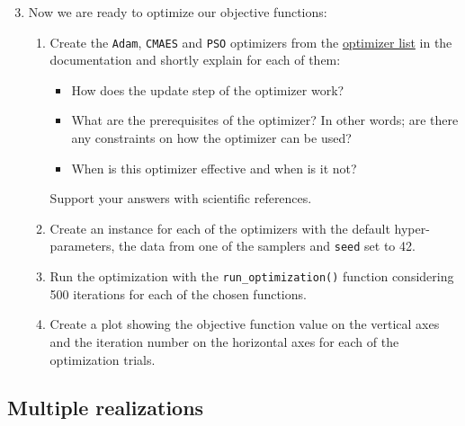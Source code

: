\documentclass[10pt,a4paper,twoside]{article} %
\def\code#1{\texttt{#1}}
\begin{document}
\begin{enumerate}
	\setcounter{enumi}{2}
	\item Now we are ready to optimize our objective functions:
	\begin{enumerate} [label*=\arabic*.]
		\item Create the \code{Adam}, \code{CMAES} and \code{PSO} optimizers from the \href{https://bessagroup.github.io/F3DASM/capabilities/algorithms.html\#implemented-optimizers}{optimizer list} in the documentation and shortly explain for each of them:
		
		\begin{itemize}
			\item How does the update step of the optimizer work?
			\item What are the prerequisites of the optimizer? In other words; are there any constraints on how the optimizer can be used?
			\item When is this optimizer effective and when is it not?
		\end{itemize}
	
		Support your answers with scientific references.
		
		\item Create an instance for each of the optimizers with the default hyper-parameters, the data from one of the samplers and \code{seed} set to 42.
		
		\item Run the optimization with the \code{run\_optimization()} function considering 500 iterations for each of the chosen functions. 
		
		\item Create a plot showing the objective function value on the vertical axes and the iteration number on the horizontal axes for each of the optimization trials.
		

		
	\end{enumerate}
\end{enumerate}

\subsection*{Multiple realizations}
\end{document}
